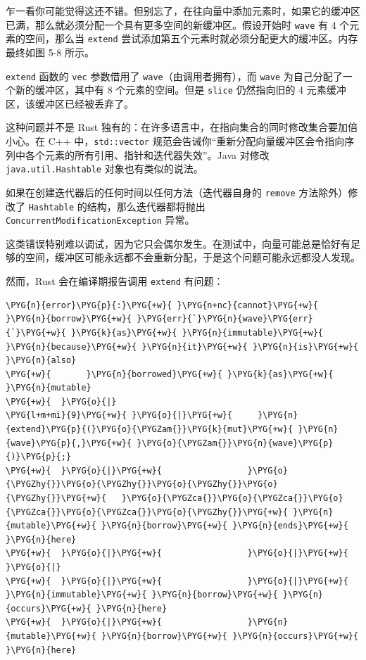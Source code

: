 乍一看你可能觉得这还不错。但别忘了，在往向量中添加元素时，如果它的缓冲区已满，那么就必须分配一个具有更多空间的新缓冲区。假设开始时 \texttt{wave} 有 4 个元素的空间，那么当 \texttt{extend} 尝试添加第五个元素时就必须分配更大的缓冲区。内存最终如图 5-8 所示。

\texttt{extend} 函数的 \texttt{vec} 参数借用了 \texttt{wave}（由调用者拥有），而 \texttt{wave} 为自己分配了一个新的缓冲区，其中有 8 个元素的空间。但是 \texttt{slice} 仍然指向旧的 4 元素缓冲区，该缓冲区已经被丢弃了。


这种问题并不是 Rust 独有的：在许多语言中，在指向集合的同时修改集合要加倍小心。在 C++ 中，\texttt{std::vector} 规范会告诫你“重新分配向量缓冲区会令指向序列中各个元素的所有引用、指针和迭代器失效”。Java 对修改 \texttt{java.util.Hashtable} 对象也有类似的说法。

\begin{myNote}
如果在创建迭代器后的任何时间以任何方法（迭代器自身的 \texttt{remove} 方法除外）修改了 \texttt{Hashtable} 的结构，那么迭代器都将抛出 \texttt{ConcurrentModificationException} 异常。
\end{myNote}

这类错误特别难以调试，因为它只会偶尔发生。在测试中，向量可能总是恰好有足够的空间，缓冲区可能永远都不会重新分配，于是这个问题可能永远都没人发现。

然而，Rust 会在编译期报告调用 \texttt{extend} 有问题：

\begin{Verbatim}[commandchars=\\\{\},breaklines=true,breakanywhere=true,fontsize=\codefont,xleftmargin=17bp]
\PYG{n}{error}\PYG{p}{:}\PYG{+w}{ }\PYG{n+nc}{cannot}\PYG{+w}{ }\PYG{n}{borrow}\PYG{+w}{ }\PYG{err}{`}\PYG{n}{wave}\PYG{err}{`}\PYG{+w}{ }\PYG{k}{as}\PYG{+w}{ }\PYG{n}{immutable}\PYG{+w}{ }\PYG{n}{because}\PYG{+w}{ }\PYG{n}{it}\PYG{+w}{ }\PYG{n}{is}\PYG{+w}{ }\PYG{n}{also}
\PYG{+w}{       }\PYG{n}{borrowed}\PYG{+w}{ }\PYG{k}{as}\PYG{+w}{ }\PYG{n}{mutable}
\PYG{+w}{  }\PYG{o}{|}
\PYG{l+m+mi}{9}\PYG{+w}{ }\PYG{o}{|}\PYG{+w}{     }\PYG{n}{extend}\PYG{p}{(}\PYG{o}{\PYGZam{}}\PYG{k}{mut}\PYG{+w}{ }\PYG{n}{wave}\PYG{p}{,}\PYG{+w}{ }\PYG{o}{\PYGZam{}}\PYG{n}{wave}\PYG{p}{)}\PYG{p}{;}
\PYG{+w}{  }\PYG{o}{|}\PYG{+w}{                 }\PYG{o}{\PYGZhy{}}\PYG{o}{\PYGZhy{}}\PYG{o}{\PYGZhy{}}\PYG{o}{\PYGZhy{}}\PYG{+w}{   }\PYG{o}{\PYGZca{}}\PYG{o}{\PYGZca{}}\PYG{o}{\PYGZca{}}\PYG{o}{\PYGZca{}}\PYG{o}{\PYGZhy{}}\PYG{+w}{ }\PYG{n}{mutable}\PYG{+w}{ }\PYG{n}{borrow}\PYG{+w}{ }\PYG{n}{ends}\PYG{+w}{ }\PYG{n}{here}
\PYG{+w}{  }\PYG{o}{|}\PYG{+w}{                 }\PYG{o}{|}\PYG{+w}{      }\PYG{o}{|}
\PYG{+w}{  }\PYG{o}{|}\PYG{+w}{                 }\PYG{o}{|}\PYG{+w}{      }\PYG{n}{immutable}\PYG{+w}{ }\PYG{n}{borrow}\PYG{+w}{ }\PYG{n}{occurs}\PYG{+w}{ }\PYG{n}{here}
\PYG{+w}{  }\PYG{o}{|}\PYG{+w}{                 }\PYG{n}{mutable}\PYG{+w}{ }\PYG{n}{borrow}\PYG{+w}{ }\PYG{n}{occurs}\PYG{+w}{ }\PYG{n}{here}
\end{Verbatim}

